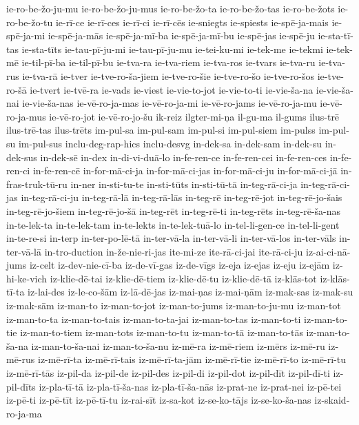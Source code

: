 {ie-ro-be-žo-ju-mu
ie-ro-be-žo-ju-mus
ie-ro-be-žo-ta
ie-ro-be-žo-tas
ie-ro-be-žots
ie-ro-be-žo-tu
ie-rī-ce
ie-rī-ces
ie-rī-ci
ie-rī-cēs
ie-sniegts
ie-spiests
ie-spē-ja-mais
ie-spē-ja-mi
ie-spē-ja-mās
ie-spē-ja-mī-ba
ie-spē-ja-mī-bu
ie-spē-jas
ie-spē-ju
ie-sta-tī-tas
ie-sta-tīts
ie-tau-pī-ju-mi
ie-tau-pī-ju-mu
ie-tei-ku-mi
ie-tek-me
ie-tekmi
ie-tek-mē
ie-til-pī-ba
ie-til-pī-bu
ie-tva-ra
ie-tva-riem
ie-tva-ros
ie-tvars
ie-tva-ru
ie-tva-rus
ie-tva-rā
ie-tver
ie-tve-ro-ša-jiem
ie-tve-ro-šie
ie-tve-ro-šo
ie-tve-ro-šos
ie-tve-ro-šā
ie-tvert
ie-tvē-ra
ie-vads
ie-viest
ie-vie-to-jot
ie-vie-to-ti
ie-vie-ša-na
ie-vie-ša-nai
ie-vie-ša-nas
ie-vē-ro-ja-mas
ie-vē-ro-ja-mi
ie-vē-ro-jams
ie-vē-ro-ja-mu
ie-vē-ro-ja-mus
ie-vē-ro-jot
ie-vē-ro-jo-šu
ik-reiz
ilgter-mi-ņa
il-gu-ma
il-gums
ilus-trē
ilus-trē-tas
ilus-trēts
im-pul-sa
im-pul-sam
im-pul-si
im-pul-siem
im-pulss
im-pul-su
im-pul-sus
inclu-deg-rap-hics
inclu-desvg
in-dek-sa
in-dek-sam
in-dek-su
in-dek-sus
in-dek-sē
in-dex
in-di-vi-duā-lo
in-fe-ren-ce
in-fe-ren-cei
in-fe-ren-ces
in-fe-ren-ci
in-fe-ren-cē
in-for-mā-ci-ja
in-for-mā-ci-jas
in-for-mā-ci-ju
in-for-mā-ci-jā
in-fras-truk-tū-ru
in-ner
in-sti-tu-te
in-sti-tūts
in-sti-tū-tā
in-teg-rā-ci-ja
in-teg-rā-ci-jas
in-teg-rā-ci-ju
in-teg-rā-lā
in-teg-rā-lās
in-teg-rē
in-teg-rē-jot
in-teg-rē-jo-šais
in-teg-rē-jo-šiem
in-teg-rē-jo-šā
in-teg-rēt
in-teg-rē-ti
in-teg-rēts
in-teg-rē-ša-nas
in-te-lek-ta
in-te-lek-tam
in-te-lekts
in-te-lek-tuā-lo
in-tel-li-gen-ce
in-tel-li-gent
in-te-re-si
in-terp
in-ter-po-lē-tā
in-ter-vā-la
in-ter-vā-li
in-ter-vā-los
in-ter-vāls
in-ter-vā-lā
in-tro-duction
in-že-nie-ri-jas
ite-mi-ze
ite-rā-ci-jai
ite-rā-ci-ju
iz-ai-ci-nā-jums
iz-celt
iz-dev-nie-cī-ba
iz-de-vī-gas
iz-de-vīgs
iz-eja
iz-ejas
iz-eju
iz-ejām
iz-hi-ke-vich
iz-klie-dē-tai
iz-klie-dē-tiem
iz-klie-dē-tu
iz-klie-dē-tā
iz-klās-tot
iz-klās-tī-ta
iz-lai-des
iz-le-co-šām
iz-lā-dē-jas
iz-mai-ņas
iz-mai-ņām
iz-mak-sas
iz-mak-su
iz-mak-sām
iz-man-to
iz-man-to-jot
iz-man-to-jums
iz-man-to-ju-mu
iz-man-tot
iz-man-to-ta
iz-man-to-tais
iz-man-to-ta-jai
iz-man-to-tas
iz-man-to-ti
iz-man-to-tie
iz-man-to-tiem
iz-man-tots
iz-man-to-tu
iz-man-to-tā
iz-man-to-tās
iz-man-to-ša-na
iz-man-to-ša-nai
iz-man-to-ša-nu
iz-mē-ra
iz-mē-riem
iz-mērs
iz-mē-ru
iz-mē-rus
iz-mē-rī-ta
iz-mē-rī-tais
iz-mē-rī-ta-jām
iz-mē-rī-tie
iz-mē-rī-to
iz-mē-rī-tu
iz-mē-rī-tās
iz-pil-da
iz-pil-de
iz-pil-des
iz-pil-di
iz-pil-dot
iz-pil-dīt
iz-pil-dī-ti
iz-pil-dīts
iz-pla-tī-tā
iz-pla-tī-ša-nas
iz-pla-tī-ša-nās
iz-prat-ne
iz-prat-nei
iz-pē-tei
iz-pē-ti
iz-pē-tīt
iz-pē-tī-tu
iz-rai-sīt
iz-sa-kot
iz-se-ko-tājs
iz-se-ko-ša-nas
iz-skaid-ro-ja-ma
}
